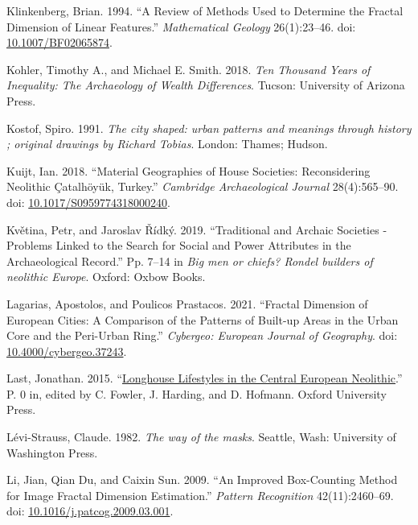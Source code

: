 \documentclass[
  12pt,
]{book}
\newlength{\cslhangindent}
\newlength{\cslentryspacingunit} %
\newenvironment{CSLReferences}[2] %
 {%
  \setlength{\parindent}{0pt}
  \ifodd #1
  \let\oldpar\par
  \def\par{\hangindent=\cslhangindent\oldpar}
  \fi
  \setlength{\parskip}{#2\cslentryspacingunit}
 }%
 {}
\begin{document}
\begin{CSLReferences}{1}{0}
\leavevmode{}%
Klinkenberg, Brian. 1994. {``A Review of Methods Used to Determine the Fractal Dimension of Linear Features.''} \emph{Mathematical Geology} 26(1):23--46. doi: \href{https://doi.org/10.1007/BF02065874}{10.1007/BF02065874}.

\leavevmode{}%
Kohler, Timothy A., and Michael E. Smith. 2018. \emph{Ten Thousand Years of Inequality: The Archaeology of Wealth Differences}. Tucson: University of Arizona Press.

\leavevmode{}%
Kostof, Spiro. 1991. \emph{The city shaped: urban patterns and meanings through history ; original drawings by Richard Tobias}. London: Thames; Hudson.

\leavevmode{}%
Kuijt, Ian. 2018. {``Material Geographies of House Societies: Reconsidering Neolithic Çatalhöyük, Turkey.''} \emph{Cambridge Archaeological Journal} 28(4):565--90. doi: \href{https://doi.org/10.1017/S0959774318000240}{10.1017/S0959774318000240}.

\leavevmode{}%
Květina, Petr, and Jaroslav Řídký. 2019. {``Traditional and Archaic Societies - Problems Linked to the Search for Social and Power Attributes in the Archaeological Record.''} Pp. 7--14 in \emph{Big men or chiefs? {Rondel} builders of neolithic {Europe}}. {Oxford}: {Oxbow Books}.

\leavevmode{}%
Lagarias, Apostolos, and Poulicos Prastacos. 2021. {``Fractal Dimension of European Cities: A Comparison of the Patterns of Built-up Areas in the Urban Core and the Peri-Urban Ring.''} \emph{Cybergeo: European Journal of Geography}. doi: \href{https://doi.org/10.4000/cybergeo.37243}{10.4000/cybergeo.37243}.

\leavevmode{}%
Last, Jonathan. 2015. {``\href{https://doi.org/10.1093/oxfordhb/9780199545841.013.009}{Longhouse Lifestyles in the Central European Neolithic}.''} P. 0 in, edited by C. Fowler, J. Harding, and D. Hofmann. Oxford University Press.

\leavevmode{}%
Lévi-Strauss, Claude. 1982. \emph{The way of the masks}. Seattle, Wash: University of Washington Press.

\leavevmode{}%
Li, Jian, Qian Du, and Caixin Sun. 2009. {``An Improved Box-Counting Method for Image Fractal Dimension Estimation.''} \emph{Pattern Recognition} 42(11):2460--69. doi: \href{https://doi.org/10.1016/j.patcog.2009.03.001}{10.1016/j.patcog.2009.03.001}.


\end{CSLReferences}
\end{document}
